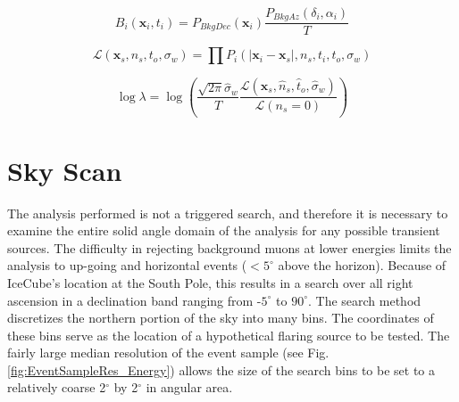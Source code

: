 \documentclass{gatech-thesis}
\begin{document}
\begin{equation}
B_i(\mathbf{x}_i,t_i) = P_{BkgDec}\left(\mathbf{x}_i\right)\frac{P_{BkgAz}(\delta_i,\alpha_i)}{T}
\end{equation}

\begin{equation}
\mathcal{L}(\mathbf{x}_s,n_s,t_o,\sigma_w) = \prod P_i(|\mathbf{x}_i-\mathbf{x}_s|,n_s,t_i,t_o,\sigma_w)
\end{equation}

\begin{equation}
\log \lambda = \log \left(\frac{\sqrt{2\pi}\hat{\sigma}_w}{T}\frac{\mathcal{L}(\mathbf{x}_s,\hat{n}_s,\hat{t}_o,\hat{\sigma}_w)}{\mathcal{L}(n_s = 0)} \right)
\end{equation}


\section{Sky Scan}

The analysis performed is not a triggered search, and therefore it is necessary to examine the entire solid angle domain of the analysis for any possible transient sources. The difficulty in rejecting background muons at lower energies limits the analysis to up-going and horizontal events ($< 5^{\circ}$ above the horizon). Because of IceCube's location at the South Pole, this results in a search over all right ascension in a declination band ranging from -$5^{\circ}$ to $90^{\circ}$. The search method discretizes the northern portion of the sky into many bins. The coordinates of these bins serve as the location of a hypothetical flaring source to be tested. The fairly large median resolution of the event sample (see Fig. \ref{fig:EventSampleRes_Energy}) allows the size of the search bins to be set to a relatively coarse 2$^{\circ}$ by 2$^{\circ}$ in angular area. 

\end{document}
